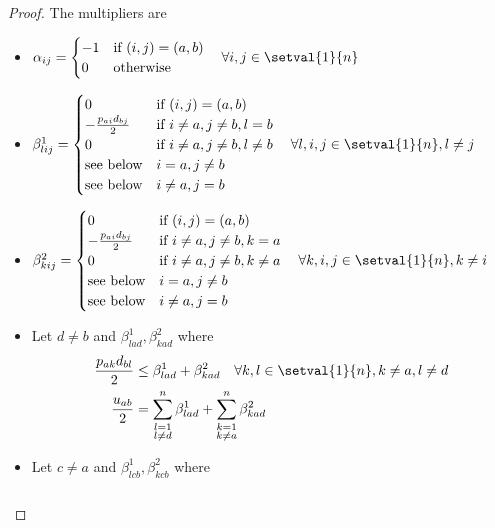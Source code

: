 \begin{proof}
	The multipliers are
	\begin{itemize}
		\item $\alpha_{ij} = 
			\begin{cases}
				-1&\text{if }(i,j) = (a,b)\\
				0&\text{otherwise}
			\end{cases}
			\quad\forall i,j \in\setval{1}{n}$
		\item $\beta^1_{lij} =
			\begin{cases}
				0&\text{if }(i,j) = (a,b)\\
				-\frac{p_{ai}d_{bj}}{2}&\text{if }i\neq a, j \neq b, l = b\\
				0&\text{if }i\neq a, j\neq b, l \neq b\\
				\text{see below}&i = a, j\neq b\\
				\text{see below}&i \neq a, j = b\\
			\end{cases}
			\quad\forall l,i,j\in\setval{1}{n}, l\neq j$
		\item $\beta^2_{kij} = 
			\begin{cases}
				0&\text{if }(i,j) = (a,b)\\
				-\frac{p_{ai}d_{bj}}{2}&\text{if }i\neq a, j \neq b, k = a\\
				0&\text{if }i\neq a, j\neq b, k \neq a\\
				\text{see below}&i = a, j\neq b\\
				\text{see below}&i \neq a, j = b\\
			\end{cases}
			\quad\forall k,i,j\in\setval{1}{n}, k\neq i$
		\item Let $d\neq b$ and $\beta^1_{lad}, \beta^2_{kad}$ where
			\begin{align}
				\label{eq:multipliersUByDual1}
				\begin{aligned}
					\frac{p_{ak}d_{bl}}{2}&\leq \beta^1_{lad}+\beta^2_{kad}\quad\forall k,l\in\setval{1}{n}, k\neq a, l\neq d\\
					\frac{u_{ab}}{2}&=\sum_{\substack{l=1\\l\neq d}}^n\beta^1_{lad} + \sum_{\substack{k=1\\k\neq a}}^n\beta^2_{kad}
				\end{aligned}
			\end{align}
		\item Let $c\neq a$ and $\beta^1_{lcb}, \beta^2_{kcb}$ where
			\begin{align}
				\label{eq:multipliersUByDual2}
				\begin{aligned}

\end{aligned}
\end{align}
\end{itemize}
\end{proof}
